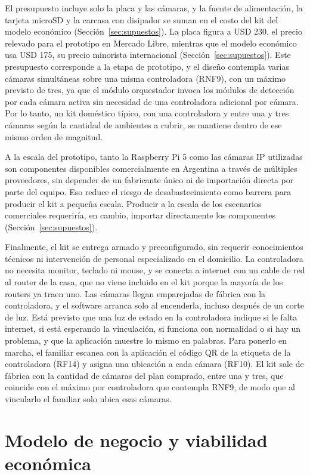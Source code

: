 El presupuesto incluye solo la placa y las cámaras, y la fuente de alimentación, la tarjeta microSD y la carcasa con disipador se suman en el costo del kit del modelo económico (Sección~\ref{sec:supuestos}).
La placa figura a USD 230, el precio relevado para el prototipo en Mercado Libre, mientras que el modelo económico usa USD 175, su precio minorista internacional (Sección~\ref{sec:supuestos}).
Este presupuesto corresponde a la etapa de prototipo, y el diseño contempla varias cámaras simultáneas sobre una misma controladora (RNF9), con un máximo previsto de tres, ya que el módulo orquestador invoca los módulos de detección por cada cámara activa sin necesidad de una controladora adicional por cámara.
Por lo tanto, un kit doméstico típico, con una controladora y entre una y tres cámaras según la cantidad de ambientes a cubrir, se mantiene dentro de ese mismo orden de magnitud.

A la escala del prototipo, tanto la Raspberry Pi 5 como las cámaras IP utilizadas son componentes disponibles comercialmente en Argentina a través de múltiples proveedores, sin depender de un fabricante único ni de importación directa por parte del equipo.
Eso reduce el riesgo de desabastecimiento como barrera para producir el kit a pequeña escala.
Producir a la escala de los escenarios comerciales requeriría, en cambio, importar directamente los componentes (Sección~\ref{sec:supuestos}).

Finalmente, el kit se entrega armado y preconfigurado, sin requerir conocimientos técnicos ni intervención de personal especializado en el domicilio.
La controladora no necesita monitor, teclado ni mouse, y se conecta a internet con un cable de red al router de la casa, que no viene incluido en el kit porque la mayoría de los routers ya traen uno.
Las cámaras llegan emparejadas de fábrica con la controladora, y el software arranca solo al encenderla, incluso después de un corte de luz.
Está previsto que una luz de estado en la controladora indique si le falta internet, si está esperando la vinculación, si funciona con normalidad o si hay un problema, y que la aplicación muestre lo mismo en palabras.
Para ponerlo en marcha, el familiar escanea con la aplicación el código QR de la etiqueta de la controladora (RF14) y asigna una ubicación a cada cámara (RF10).
El kit sale de fábrica con la cantidad de cámaras del plan comprado, entre una y tres, que coincide con el máximo por controladora que contempla RNF9, de modo que al vincularlo el familiar solo ubica esas cámaras.


\section{Modelo de negocio y viabilidad económica}
\label{sec:modelo-negocio}

